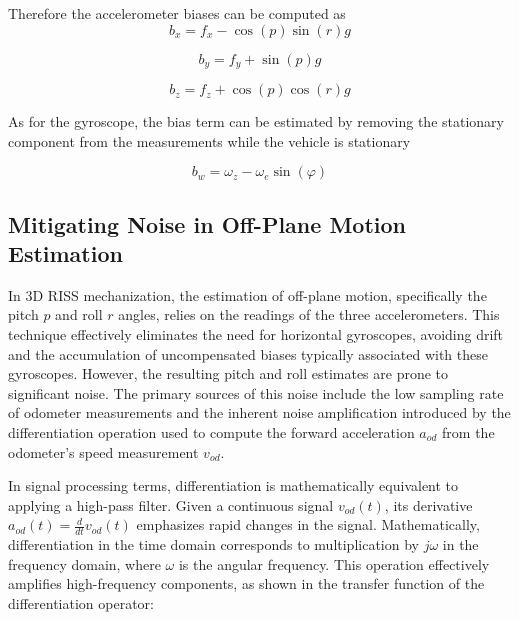 \documentclass[conference]{IEEEtran}
\begin{document}
Therefore the accelerometer biases can be computed as
\begin{equation}
b_x = f_x - \cos(p) \sin(r) g
\label{eq:bias_x}
\end{equation}

\begin{equation}
b_y = f_y + \sin(p) g
\label{eq:bias_y}
\end{equation}

\begin{equation}
b_z = f_z + \cos(p) \cos(r) g
\label{eq:bias_z}
\end{equation}

As for the gyroscope, the bias term can be estimated by removing the stationary component from the measurements while the vehicle is stationary

\begin{equation}
b_w = \omega_z - \omega_e \sin(\varphi)
\label{eq:bias_gyro}
\end{equation}

\subsection{Mitigating Noise in Off-Plane Motion Estimation}

In 3D RISS mechanization, the estimation of off-plane motion, specifically the pitch \( p \) and roll \( r \) angles, relies on the readings of the three accelerometers. This technique effectively eliminates the need for horizontal gyroscopes, avoiding drift and the accumulation of uncompensated biases typically associated with these gyroscopes. However, the resulting pitch and roll estimates are prone to significant noise. The primary sources of this noise include the low sampling rate of odometer measurements and the inherent noise amplification introduced by the differentiation operation used to compute the forward acceleration \( a_{od} \) from the odometer’s speed measurement \( v_{od} \).

In signal processing terms, differentiation is mathematically equivalent to applying a high-pass filter. Given a continuous signal \( v_{od}(t) \), its derivative \( a_{od}(t) = \frac{d}{dt}v_{od}(t) \) emphasizes rapid changes in the signal. Mathematically, differentiation in the time domain corresponds to multiplication by \( j\omega \) in the frequency domain, where \( \omega \) is the angular frequency. This operation effectively amplifies high-frequency components, as shown in the transfer function of the differentiation operator:
\end{document}
